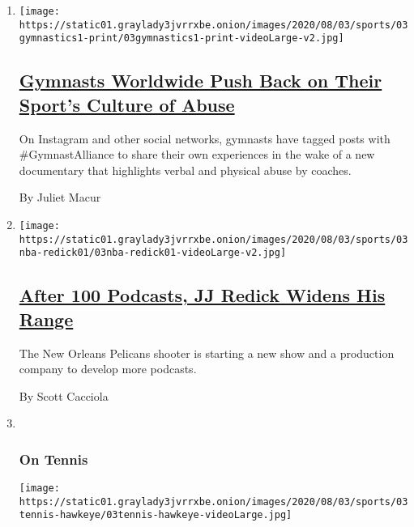 \begin{enumerate}
\def\labelenumi{\arabic{enumi}.}
\item
  \texttt{[image: https://static01.graylady3jvrrxbe.onion/images/2020/08/03/sports/03gymnastics1-print/03gymnastics1-print-videoLarge-v2.jpg]}

  \hypertarget{gymnasts-worldwide-push-back-on-their-sports-culture-of-abuse}{%
  \subsection{\texorpdfstring{\href{/2020/08/03/sports/olympics/gymnastics-abuse-athlete-a.html}{Gymnasts
  Worldwide Push Back on Their Sport's Culture of
  Abuse}}{Gymnasts Worldwide Push Back on Their Sport's Culture of Abuse}}\label{gymnasts-worldwide-push-back-on-their-sports-culture-of-abuse}}

  On Instagram and other social networks, gymnasts have tagged posts
  with \#GymnastAlliance to share their own experiences in the wake of a
  new documentary that highlights verbal and physical abuse by coaches.

  By Juliet Macur
\item
  \texttt{[image: https://static01.graylady3jvrrxbe.onion/images/2020/08/03/sports/03nba-redick01/03nba-redick01-videoLarge-v2.jpg]}

  \hypertarget{after-100-podcasts-jj-redick-widens-his-range}{%
  \subsection{\texorpdfstring{\href{/2020/08/03/sports/jj-redick-podcast.html}{After
  100 Podcasts, JJ Redick Widens His
  Range}}{After 100 Podcasts, JJ Redick Widens His Range}}\label{after-100-podcasts-jj-redick-widens-his-range}}

  The New Orleans Pelicans shooter is starting a new show and a
  production company to develop more podcasts.

  By Scott Cacciola
\item ~
  \hypertarget{on-tennis}{%
  \subsubsection{On Tennis}\label{on-tennis}}

  \texttt{[image: https://static01.graylady3jvrrxbe.onion/images/2020/08/03/sports/03tennis-hawkeye/03tennis-hawkeye-videoLarge.jpg]}

  \hypertarget{automated-line-calls-will-replace-human-judges-at-us-open}{%
}
\end{enumerate}
